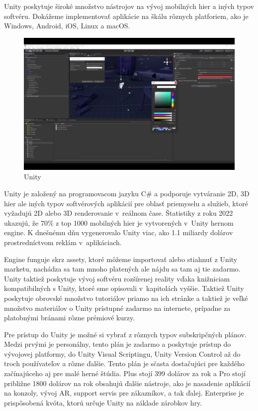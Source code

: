 Unity poskytuje široké množstvo nástrojov na vývoj mobilných hier a iných typov softvéru. Dokážeme implementovať aplikácie na škálu rôznych platforiem, ako je Windows, Android, iOS, Linux a macOS. 

\begin{figure}[h]
\centering
\includegraphics[width=1\textwidth]{img/unityEditor.png}
\caption{Unity \cite{unityscreenshot}}
\label{fig:godotEditor}
\end{figure}

Unity je založený na programovacom jazyku C\# a podporuje vytváranie 2D, 3D hier ale iných typov softvérových aplikácií pre oblasť priemyselu a služieb, ktoré vyžadujú 2D alebo 3D renderovanie v~reálnom čase. Štatistiky z roku 2022 ukazujú, že 70\% z top 1000 mobilných hier je vytvorených v~Unity hernom engine. K dnešnému dňu vygenerovalo Unity viac, ako 1.1 miliardy dolárov prostredníctvom reklám v~aplikáciach.

Engine funguje skrz assety, ktoré môžeme importovať alebo stiahnuť z Unity marketu, nachádza sa tam mnoho platených ale nájdu sa tam aj tie zadarmo. Unity taktiež poskytuje vývoj softvéru rozšírenej reality vďaka knižniciam kompatibilných s Unity, ktoré sme opisovali v~kapitolách vyššie. Taktiež Unity poskytuje obrovské množstvo tutoriálov priamo na ich stránke a taktiež je veľké množstvo materiálov o Unity prístupné zadarmo na internete, prípadne za platobnými bránami rôzne prémiové kurzy.

Pre prístup do Unity je možné si vybrať z rôznych typov subskripčných plánov. Medzi prvými je personálny, tento plán je zadarmo a poskytuje prístup do vývojovej platformy, do Unity Visual Scriptingu, Unity Version Control až do troch používateľov a rôzne ďalšie. Tento plán je sčasta dostačujúci pre každého začínajúceho aj pre malé herné štúdia. Plus stojí 399 dolárov za rok a Pro stojí približne 1800 dolárov na rok obsahujú ďalšie nástroje, ako je nasadenie aplikácií na konzoly, vývoj AR, support servis pre zákazníkov, a tak ďalej. Enterprise je prispôsobená kvóta, ktorú určuje Unity na základe zárobkov hry. 

